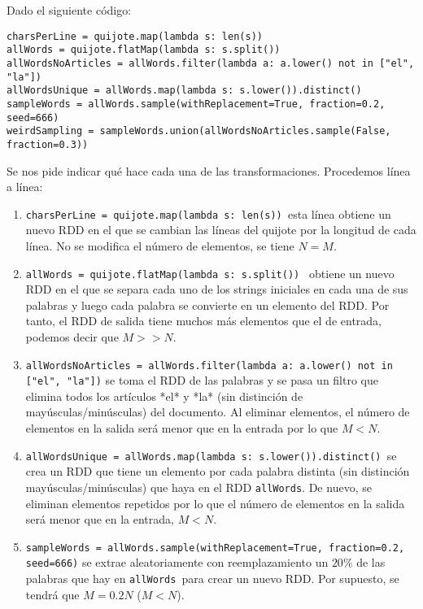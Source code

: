 \documentclass[11pt]{article}
\def\inline{\lstinline[basicstyle=\ttfamily,keywordstyle={}]}
\begin{document}
{{Dado el siguiente código:
\begin{verbatim}
charsPerLine = quijote.map(lambda s: len(s))
allWords = quijote.flatMap(lambda s: s.split())
allWordsNoArticles = allWords.filter(lambda a: a.lower() not in ["el", "la"])
allWordsUnique = allWords.map(lambda s: s.lower()).distinct()
sampleWords = allWords.sample(withReplacement=True, fraction=0.2, seed=666)
weirdSampling = sampleWords.union(allWordsNoArticles.sample(False, fraction=0.3))
\end{verbatim}
Se nos pide indicar qué hace cada una de las transformaciones. Procedemos línea a línea:

\begin{enumerate}
\item  \inline{charsPerLine = quijote.map(lambda s: len(s)) }esta línea obtiene un nuevo RDD en el que se cambian las líneas del quijote por la longitud de cada línea. No se modifica el número de elementos, se tiene $N = M$.

\item  \inline{allWords = quijote.flatMap(lambda s: s.split()) } obtiene un nuevo RDD en el que se separa cada uno de los strings iniciales en cada una de sus palabras y luego cada palabra se convierte en un elemento del RDD. Por tanto, el RDD de salida tiene muchos más elementos que el de entrada, podemos decir que $M >> N$.

\item  \inline{allWordsNoArticles = allWords.filter(lambda a: a.lower() not in ["el", "la"])} se toma el RDD de las palabras y se pasa un filtro que elimina todos los artículos *el* y *la* (sin distinción de mayúsculas/minúsculas) del documento. Al eliminar elementos, el número de elementos en la salida será menor que en la entrada por lo que $M < N$.

\item  \inline{allWordsUnique = allWords.map(lambda s: s.lower()).distinct() }se crea un RDD que tiene un elemento por cada palabra distinta (sin distinción mayúsculas/minúsculas) que haya en el RDD  \inline{allWords}. De nuevo, se eliminan elementos repetidos por lo que el número de elementos en la salida será menor que en la entrada, $M < N$.

\item  \inline{sampleWords = allWords.sample(withReplacement=True, fraction=0.2, seed=666)} se extrae aleatoriamente con reemplazamiento un $20\%$ de las palabras que hay en \inline{allWords }para crear un nuevo RDD. Por supuesto, se tendrá que $M = 0.2 N$ ($M < N$).


\end{enumerate}}}
\end{document}
